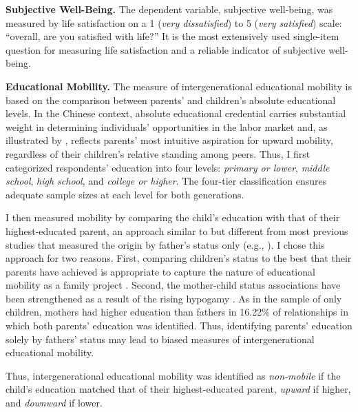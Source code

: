 \textbf{Subjective Well-Being.} The dependent variable, subjective well-being, was measured by life satisfaction on a 1 (\textit{very dissatisfied}) to 5 (\textit{very satisfied}) scale: “overall, are you satisfied with life?” It is the most extensively used single-item question for measuring life satisfaction and a reliable indicator of subjective well-being.

\textbf{Educational Mobility.} The measure of intergenerational educational mobility is based on the comparison between parents' and children's absolute educational levels. In the Chinese context, absolute educational credential carries substantial weight in determining individuals' opportunities in the labor market and, as illustrated by \textcite{xuHopingPhoenixShanghai2013}, reflects parents' most intuitive aspiration for upward mobility, regardless of their children's relative standing among peers. Thus, I first categorized respondents' education into four levels: \textit{primary or lower}, \textit{middle school}, \textit{high school}, and \textit{college or higher}. The four-tier classification ensures adequate sample sizes at each level for both generations.

I then measured mobility by comparing the child's education with that of their highest-educated parent, an approach similar to \textcite{schuckDoesIntergenerationalEducational2018} but different from most previous studies that measured the origin by father's status only (e.g., \cite{dhooreSocialMobilityLife2019,kwonImpactIntergenerationalMobility2022,zangFrustratedAchieversSatisfied2016}). I chose this approach for two reasons. First, comparing children's status to the best that their parents have achieved is appropriate to capture the nature of educational mobility as a family project \parencite{guSacrificeIndebtednessIntergenerational2022}. Second, the mother-child status associations have been strengthened as a result of the rising hypogamy \parencite{huGenderEducationExpansion2023}. As in the sample of only children, mothers had higher education than fathers in 16.22\% of relationships in which both parents' education was identified. Thus, identifying parents' education solely by fathers' status may lead to biased measures of intergenerational educational mobility.

Thus, intergenerational educational mobility was identified as \textit{non-mobile} if the child's education matched that of their highest-educated parent, \textit{upward} if higher, and \textit{downward} if lower.

